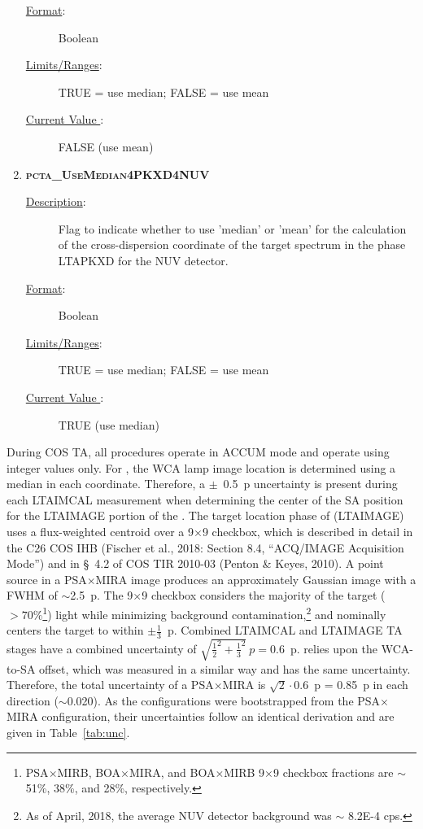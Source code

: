 \begin{enumerate}
\begin{description}
	\item[\underline{\rm Format}:]    Boolean
	\item[\underline{\rm Limits/Ranges}:]  TRUE = use median;  FALSE = use mean
	\item[\underline{\rm Current Value }:]   FALSE (use mean)
\end{description}
\item{\textsc{\bf pcta\_UseMedian4PKXD4NUV}}
	\begin{description}
	\item[\underline{\rm Description}:]Flag to indicate whether to use 'median' or 'mean' for the calculation of the cross-dispersion coordinate of the target spectrum in the phase \textsc{LTAPKXD} for the NUV detector.
	\item[\underline{\rm Format}:]    Boolean
	\item[\underline{\rm Limits/Ranges}:]  TRUE = use median;  FALSE = use mean
	\item[\underline{\rm Current Value }:]   TRUE (use median)
\end{description}
\end{enumerate}
\normalsize

During COS TA, all \tacq{} procedures operate in ACCUM mode and operate using integer values only.
For , the WCA lamp image location is determined using a median in each coordinate. Therefore, a $\pm$~0.5~p uncertainty is present during each \textsc{LTAIMCAL} measurement when determining the center of the SA position for the
\textsc{LTAIMAGE} portion of the . The target location phase of  (\textsc{LTAIMAGE}) uses a flux-weighted centroid over a 9$\times$9 checkbox, which is described in detail in the C26 COS IHB (Fischer et al., 2018: Section 8.4, ``ACQ/IMAGE Acquisition Mode'') and in \S~4.2
of COS TIR 2010-03 (Penton \& Keyes, 2010). A point source in a PSA$\times$MIRA image produces an approximately Gaussian image with a FWHM of $\sim$2.5~p.
The 9$\times$9 checkbox considers the majority of the target ($>70\%$\footnote{PSA$\times$MIRB, BOA$\times$MIRA, and BOA$\times$MIRB 9$\times$9 checkbox fractions are $\sim$ 51\%, 38\%, and 28\%, respectively.})
light while minimizing background contamination,\footnote{As of April, 2018, the average NUV detector background was $\sim$ 8.2E-4 cps.} and nominally centers the target to within $\pm \frac{1}{3}$~p.
Combined \textsc{LTAIMCAL} and \textsc{LTAIMAGE} TA stages have a combined uncertainty of $\sqrt{\frac{1}{2}^2 + \frac{1}{3}^2}~p = 0.6$~p.
 relies upon the WCA-to-SA offset, which was measured in a similar way and has the same uncertainty. Therefore, the total uncertainty
of a PSA$\times$MIRA  is $\sqrt{2} \cdot 0.6$~p = 0.85~p in each direction ($\sim$0.020\arcsec{}). As the
 configurations were bootstrapped from the PSA$\times$MIRA configuration, their uncertainties follow an identical derivation and
are given in Table~\ref{tab:unc}.

